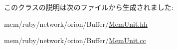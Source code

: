このクラスの説明は次のファイルから生成されました:\begin{DoxyCompactItemize}
\item 
mem/ruby/network/orion/Buffer/\hyperlink{MemUnit_8hh}{MemUnit.hh}\item 
mem/ruby/network/orion/Buffer/\hyperlink{MemUnit_8cc}{MemUnit.cc}\end{DoxyCompactItemize}
